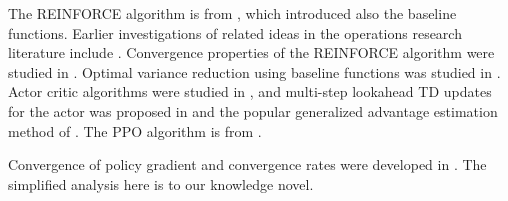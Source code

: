 The REINFORCE algorithm is from \cite{Williams92}, which introduced also the baseline functions. Earlier investigations of related ideas in the operations research literature include \cite{glynn1990likelihood,fu1994optimization}. Convergence properties of the REINFORCE algorithm were studied in \cite{PhansalkarT95,baxter2001infinite,marbach2002simulation}. Optimal variance reduction using baseline functions was studied in \cite{greensmith2004variance}. Actor critic algorithms were studied in \cite{konda1999actor,bhatnagar2007incremental}, and multi-step lookahead TD updates for the actor was proposed in \cite{castro2010convergent} and the popular generalized advantage estimation method of \cite{schulman2015high}. The PPO algorithm is from \cite{schulman2017proximal}.

Convergence of policy gradient and convergence rates were developed in \citep{shani2020adaptive,bhandari2024global}. The simplified analysis here is to our knowledge novel.





%



